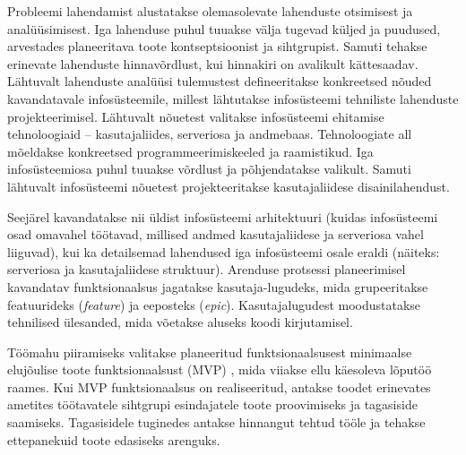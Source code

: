 \label{chapters:metodology}
Probleemi lahendamist alustatakse olemasolevate lahenduste otsimisest ja analüüsimisest. Iga lahenduse puhul
tuuakse välja tugevad küljed ja puudused, arvestades planeeritava toote kontseptsioonist ja sihtgrupist. Samuti
tehakse erinevate lahenduste hinnavõrdlust, kui hinnakiri on avalikult kättesaadav.
Lähtuvalt lahenduste analüüsi tulemustest defineeritakse konkreetsed nõuded kavandatavale 
infosüsteemile, millest lähtutakse infosüsteemi tehniliste lahenduste projekteerimisel.
Lähtuvalt nõuetest valitakse infosüsteemi ehitamise tehnoloogiaid -- kasutajaliides,
serveriosa ja andmebaas. Tehnoloogiate all mõeldakse konkreetsed programmeerimiskeeled ja raamistikud.
Iga infosüsteemiosa puhul tuuakse võrdlust ja põhjendatakse valikult. Samuti lähtuvalt infosüsteemi 
nõuetest projekteeritakse kasutajaliidese disainilahendust.

Seejärel kavandatakse nii üldist infosüsteemi arhitektuuri (kuidas infosüsteemi osad omavahel töötavad, millised andmed
kasutajaliidese ja serveriosa vahel liiguvad), kui ka detailsemad lahendused iga infosüsteemi osale eraldi 
(näiteks: serveriosa ja kasutajaliidese struktuur). Arenduse protsessi planeerimisel kavandatav funktsionaalsus jagatakse kasutaja-lugudeks, mida grupeeritakse
featuurideks (\textit{feature}) ja eeposteks (\textit{epic}). Kasutajalugudest moodustatakse tehnilised ülesanded,
mida võetakse aluseks koodi kirjutamisel. 

Töömahu piiramiseks valitakse planeeritud funktsionaalsusest minimaalse elujõulise 
toote funktsionaalsust (MVP) \cite{lean_startup_book}, mida viiakse ellu käesoleva lõputöö raames. Kui MVP funktsionaalsus 
on realiseeritud, antakse toodet erinevates ametites töötavatele sihtgrupi esindajatele toote
proovimiseks ja tagasiside saamiseks. Tagasisidele tuginedes antakse hinnangut tehtud tööle ja tehakse ettepanekuid
toote edasiseks arenguks.


